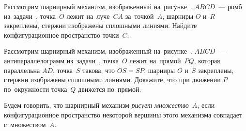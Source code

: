 \begin{problems}
\item{}
%
Рассмотрим шарнирный механизм, изображенный
на~рисунке~.
$ABCD$~--- ромб из~задачи~,
точка~$O$ лежит на~луче~$CA$ за~точкой~$A$,
шарниры $O$ и~$R$ закреплены, стержни изображены сплошными линиями.
Найдите конфигурационное пространство точки~$C$.

\item{}
%
Рассмотрим шарнирный механизм, изображенный
на~рисунке~.
$ABCD$~--- антипараллелограмм
из~задачи~,
точка~$O$ лежит на~прямой~$PQ$, которая параллельна $AD$, точка~$S$ такова,
что $OS = SP$, шарниры $O$ и~$S$ закреплены, стержни изображены сплошными
линиями.
Докажите, что при движении $P$ по~окружности точка~$Q$ движется по~прямой.

\end{problems}

Будем говорить, что шарнирный механизм \emph{рисует множество~$A$}, если
конфигурационное пространство некоторой вершины этого механизма совпадает
с~множеством~$A$.

